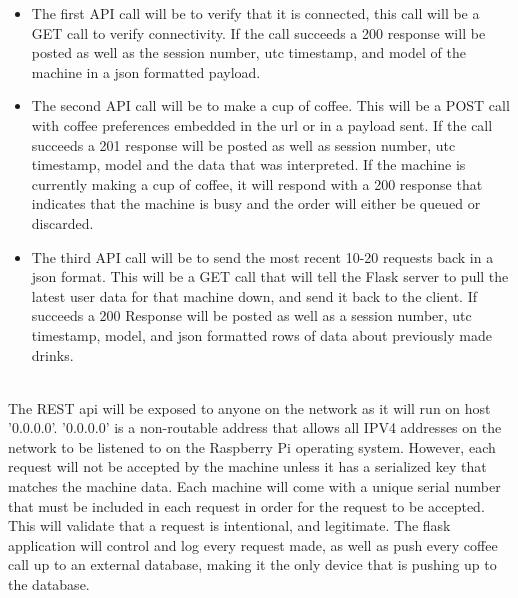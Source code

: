 \documentclass[conference]{IEEEtran}
\begin{document}
\begin{itemize}
\item The first API call will be to verify that it is connected, this call will be a GET call to verify connectivity. If the call succeeds a 200 response will be posted as well as the session number, utc timestamp, and model of the machine in a json formatted payload.
\item The second API call will be to make a cup of coffee. This will be a POST call with coffee preferences embedded in the url or in a payload sent. If the call succeeds a 201 response will be posted as well as session number, utc timestamp, model and the data that was interpreted. If the machine is currently making a cup of coffee, it will respond with a 200 response that indicates that the machine is busy and the order will either be queued or discarded.
\item The third API call will be to send the most recent 10-20 requests back in a json format. This will be a GET call that will tell the Flask server to pull the latest user data for that machine down, and send it back to the client. If succeeds a 200 Response will be posted as well as a session number, utc timestamp, model, and json formatted rows of data about previously made drinks.
\end{itemize}
\ \\

The REST api will be exposed to anyone on the network as it will run on host '0.0.0.0'. '0.0.0.0' is a non-routable address that allows all IPV4 addresses on the network to be listened to on the Raspberry Pi operating system.
However, each request will not be accepted by the machine unless it has a serialized key that matches the machine data. Each machine will come with a unique serial number that must be included in each request
in order for the request to be accepted. This will validate that a request is intentional, and legitimate.
The flask application will control and log every request made, as well as push every coffee call up to an external database, making it the only device that is pushing up to the database.
\end{document}
